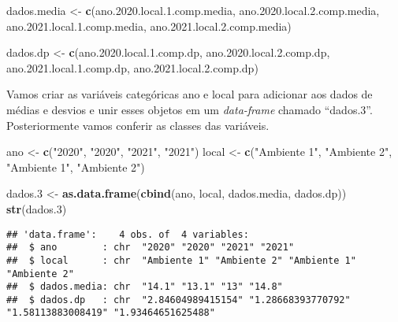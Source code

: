 \documentclass[titlepage, oneside, openany, a4paper]{book}
\newenvironment{Shaded}{\begin{snugshade}}{\end{snugshade}}
\newcommand{\FloatTok}[1]{\textcolor[rgb]{0.00,0.00,0.81}{#1}}
\newcommand{\KeywordTok}[1]{\textcolor[rgb]{0.13,0.29,0.53}{\textbf{#1}}}
\newcommand{\NormalTok}[1]{#1}
\newcommand{\StringTok}[1]{\textcolor[rgb]{0.31,0.60,0.02}{#1}}
\begin{document}
\begin{Shaded}
\begin{Highlighting}[]
\NormalTok{dados.media <-}\StringTok{ }\KeywordTok{c}\NormalTok{(ano.}\FloatTok{2020.}\NormalTok{local.}\FloatTok{1.}\NormalTok{comp.media,}
\NormalTok{                 ano.}\FloatTok{2020.}\NormalTok{local.}\FloatTok{2.}\NormalTok{comp.media,}
\NormalTok{                 ano.}\FloatTok{2021.}\NormalTok{local.}\FloatTok{1.}\NormalTok{comp.media,}
\NormalTok{                 ano.}\FloatTok{2021.}\NormalTok{local.}\FloatTok{2.}\NormalTok{comp.media)}

\NormalTok{dados.dp <-}\StringTok{ }\KeywordTok{c}\NormalTok{(ano.}\FloatTok{2020.}\NormalTok{local.}\FloatTok{1.}\NormalTok{comp.dp,}
\NormalTok{              ano.}\FloatTok{2020.}\NormalTok{local.}\FloatTok{2.}\NormalTok{comp.dp,}
\NormalTok{              ano.}\FloatTok{2021.}\NormalTok{local.}\FloatTok{1.}\NormalTok{comp.dp,}
\NormalTok{              ano.}\FloatTok{2021.}\NormalTok{local.}\FloatTok{2.}\NormalTok{comp.dp)}
\end{Highlighting}
\end{Shaded}

Vamos criar as variáveis categóricas ano e local para adicionar aos dados de médias e desvios e unir esses objetos em um \emph{data-frame} chamado ``dados.3''. Posteriormente vamos conferir as classes das variáveis.

\begin{Shaded}
\begin{Highlighting}[]
\NormalTok{ano <-}\StringTok{ }\KeywordTok{c}\NormalTok{(}\StringTok{"2020"}\NormalTok{, }\StringTok{"2020"}\NormalTok{, }\StringTok{"2021"}\NormalTok{, }\StringTok{"2021"}\NormalTok{)}
\NormalTok{local <-}\StringTok{ }\KeywordTok{c}\NormalTok{(}\StringTok{"Ambiente 1"}\NormalTok{, }\StringTok{"Ambiente 2"}\NormalTok{, }\StringTok{"Ambiente 1"}\NormalTok{, }\StringTok{"Ambiente 2"}\NormalTok{)}

\NormalTok{dados}\FloatTok{.3}\NormalTok{ <-}\StringTok{ }\KeywordTok{as.data.frame}\NormalTok{(}\KeywordTok{cbind}\NormalTok{(ano, local, dados.media, dados.dp))}
\KeywordTok{str}\NormalTok{(dados}\FloatTok{.3}\NormalTok{)}
\end{Highlighting}
\end{Shaded}

\begin{verbatim}
## 'data.frame':    4 obs. of  4 variables:
##  $ ano        : chr  "2020" "2020" "2021" "2021"
##  $ local      : chr  "Ambiente 1" "Ambiente 2" "Ambiente 1" "Ambiente 2"
##  $ dados.media: chr  "14.1" "13.1" "13" "14.8"
##  $ dados.dp   : chr  "2.84604989415154" "1.28668393770792" "1.58113883008419" "1.93464651625488"
\end{verbatim}
\end{document}
